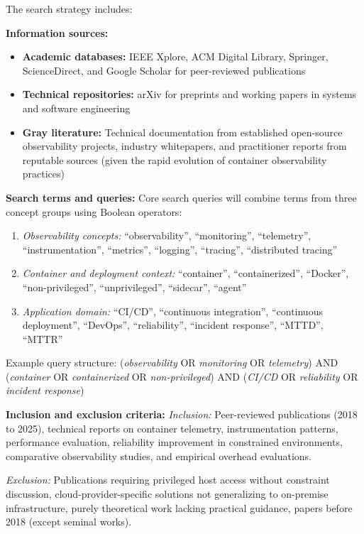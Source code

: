 The search strategy includes:

\textbf{Information sources:}
\begin{itemize}
    \item \textbf{Academic databases:} IEEE Xplore, ACM Digital Library, Springer, ScienceDirect, and Google Scholar for peer-reviewed publications
    \item \textbf{Technical repositories:} arXiv for preprints and working papers in systems and software engineering
    \item \textbf{Gray literature:} Technical documentation from established open-source observability projects, industry whitepapers, and practitioner reports from reputable sources (given the rapid evolution of container observability practices)
\end{itemize}

\textbf{Search terms and queries:}
Core search queries will combine terms from three concept groups using Boolean operators:
\begin{enumerate}
    \item \textit{Observability concepts:} ``observability'', ``monitoring'', ``telemetry'', ``instrumentation'', ``metrics'', ``logging'', ``tracing'', ``distributed tracing''
    \item \textit{Container and deployment context:} ``container'', ``containerized'', ``Docker'', ``non-privileged'', ``unprivileged'', ``sidecar'', ``agent''
    \item \textit{Application domain:} ``CI/CD'', ``continuous integration'', ``continuous deployment'', ``DevOps'', ``reliability'', ``incident response'', ``MTTD'', ``MTTR''
\end{enumerate}

Example query structure: (\textit{observability} OR \textit{monitoring} OR \textit{telemetry}) AND (\textit{container} OR \textit{containerized} OR \textit{non-privileged}) AND (\textit{CI/CD} OR \textit{reliability} OR \textit{incident response})

\textbf{Inclusion and exclusion criteria:}
\textit{Inclusion:} Peer-reviewed publications (2018 to 2025), technical reports on container telemetry, instrumentation patterns, performance evaluation, reliability improvement in constrained environments, comparative observability studies, and empirical overhead evaluations.

\textit{Exclusion:} Publications requiring privileged host access without constraint discussion, cloud-provider-specific solutions not generalizing to on-premise infrastructure, purely theoretical work lacking practical guidance, papers before 2018 (except seminal works).

